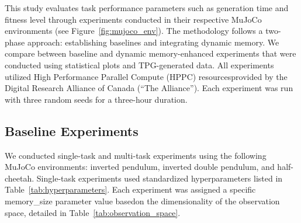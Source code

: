 \documentclass[sigconf]{acmart}
\begin{document}
This study evaluates task performance parameters such as generation time and 
fitness level through experiments conducted in their respective MuJoCo environments 
(see Figure~\ref{fig:mujoco_env}). The methodology follows a two-phase approach: establishing baselines
and integrating dynamic memory. We compare between baseline and dynamic memory-enhanced
experiments that were conducted using statistical plots and TPG-generated data. All
experiments utilized High Performance Parallel Compute (HPPC) resourcesprovided by the
Digital Research Alliance of Canada (“The Alliance”). Each experiment was run with three
random seeds for a three-hour duration.

\subsection{Baseline Experiments}
We conducted single-task and multi-task experiments using the following MuJoCo environments:
inverted pendulum, inverted double pendulum, and half-cheetah. Single-task experiments used standardized
hyperparameters listed in Table~\ref{tab:hyperparameters}. Each experiment was assigned a specific memory\_size 
parameter value basedon the dimensionality of the observation space, detailed in Table~\ref{tab:observation_space}.
\end{document}
